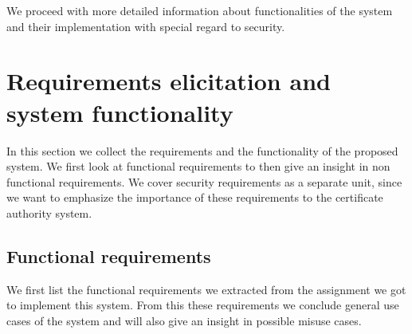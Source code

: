 \documentclass[a4paper, toc=index, 12pt, DIV14, twoside, BCOR2cm, headsepline, numbers=noenddot, bibliography=totoc]{scrbook}
\begin{document}
We proceed with more detailed information about functionalities of the system and their implementation with special regard to security.

\section{Requirements elicitation and system functionality}
In this section we collect the requirements and the functionality of the proposed system. We first look at functional requirements to then give an insight in non functional requirements. We cover security requirements as a separate unit, since we want to emphasize the importance of these requirements to the certificate authority system.  
\subsection{Functional requirements}
We first list the functional requirements we extracted from the assignment we got to implement this system. From this these requirements we conclude general use cases of the system and will also give an insight in possible misuse cases.
\end{document}
